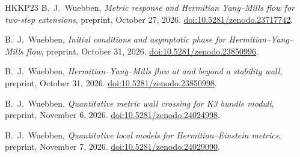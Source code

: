 \begin{thebibliography}{HKKP23}
B.~J.~Wuebben,
\emph{Metric response and Hermitian Yang--Mills flow for two-step extensions},
preprint, October 27, 2026.
\href{https://doi.org/10.5281/zenodo.23717742}{doi:10.5281/zenodo.23717742}.

B.~J.~Wuebben,
\emph{Initial conditions and asymptotic phase for Hermitian--Yang--Mills flow},
preprint, October 31, 2026.
\href{https://doi.org/10.5281/zenodo.23850996}{doi:10.5281/zenodo.23850996}.

B.~J.~Wuebben,
\emph{Hermitian--Yang--Mills flow at and beyond a stability wall},
preprint, October 31, 2026.
\href{https://doi.org/10.5281/zenodo.23850998}{doi:10.5281/zenodo.23850998}.

B.~J.~Wuebben,
\emph{Quantitative metric wall crossing for K3 bundle moduli},
preprint, November 6, 2026.
\href{https://doi.org/10.5281/zenodo.24024998}{doi:10.5281/zenodo.24024998}.

B.~J.~Wuebben,
\emph{Quantitative local models for Hermitian--Einstein metrics},
preprint, November 7, 2026.
\href{https://doi.org/10.5281/zenodo.24029090}{doi:10.5281/zenodo.24029090}.

\end{thebibliography}
